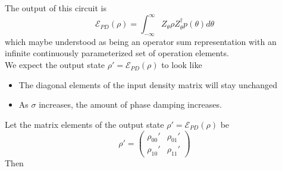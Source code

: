 The output of this circuit is 
\begin{equation}
    \mathcal{E}_{PD}(\rho) = \int_{-\infty}^{\infty}Z_\theta \rho Z_\theta^\dagger p(\theta) d\theta
\end{equation}
which maybe understood as being an operator sum representation with an infinite continuously parameterized set of operation elements. \\
We expect the output state $\rho' = \mathcal{E}_{PD}(\rho)$ to look like
\begin{itemize}
    \item The diagonal elements of the input density matrix will stay unchanged
    \item As $\sigma$ increases, the amount of phase damping increases.
\end{itemize}
Let the matrix elements of the output state $\rho' = \mathcal{E}_{PD}(\rho)$ be 
\begin{equation}
    \rho' = \begin{pmatrix}
        \rho_{00}' & \rho_{01}' \\ \rho_{10}' & \rho_{11}'
    \end{pmatrix}
\end{equation}
Then 
